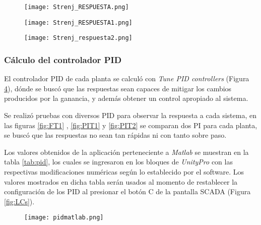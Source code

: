 {\begin{comment}
 dónde el motor no era esforzado a calentarse ni la bomba era sobreexigida

escalones ubicados en la parte central del rango útil estipulado .

 además obtener un control apropiado al sistema: algo no muy rapido ni muy lento
\end{comment}


\begin{figure}[htb]
	\centering
	\texttt{[image: Strenj\_RESPUESTA.png]}
	\label{fig:FT01}
\end{figure}
\begin{figure}[htb]
	\centering
	\texttt{[image: Strenj\_RESPUESTA1.png]}
	\label{fig:PIT01}
\end{figure}




\begin{figure}[htb]
	\centering
	\texttt{[image: Strenj\_respuesta2.png]}
	\label{fig:PIT02}
\end{figure}






\subsubsection{Cálculo del controlador PID}
El controlador PID de cada planta se calculó con \textit{Tune PID controllers} (Figura \ref{fig:PIDcontr}), dónde se buscó que las respuestas sean capaces de mitigar los cambios producidos por la ganancia, y además obtener un control apropiado al sistema. 

Se realizó pruebas con diversos PID para observar la respuesta a cada sistema, en las figuras \ref{fig:FT1} , \ref{fig:PIT1} y \ref{fig:PIT2} se comparan dos PI para cada planta, se buscó que las respuestas no sean tan rápidas ni con tanto sobre paso.

Los valores obtenidos de la aplicación perteneciente a \textit{Matlab} se muestran en la tabla \ref{tab:pid}, los cuales se ingresaron en los bloques de \textit{UnityPro} con las respectivas modificaciones numéricas según lo establecido por el software. Los valores mostrados en dicha tabla serán usados al momento de restablecer la configuración de los PID al presionar el botón C de la pantalla SCADA (Figura \ref{fig:LCs}).
\begin{figure}[h!]
	\centering
	\texttt{[image: pidmatlab.png]}
	\label{fig:PIDcontr}
\end{figure}

}
